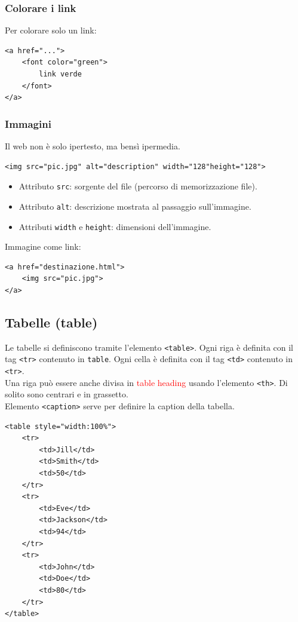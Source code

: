 \documentclass{article}
\begin{document}
\subsubsection{Colorare i link}
Per colorare solo un link:
\begin{lstlisting}[style=htmlstyle]
<a href="...">
    <font color="green">
        link verde
    </font>
</a>
\end{lstlisting}
\subsubsection{Immagini}
Il web non è solo ipertesto, ma bensì ipermedia.
\begin{lstlisting}[style=htmlstyle]
<img src="pic.jpg" alt="description" width="128"height="128">
\end{lstlisting}
\begin{itemize}
    \item Attributo \texttt{src}: sorgente del file (percorso di memorizzazione file).
    \item Attributo \texttt{alt}: descrizione mostrata al passaggio sull'immagine.
    \item Attributi \texttt{width} e \texttt{height}: dimensioni dell'immagine.
\end{itemize}
Immagine come link:
\begin{lstlisting}[style=htmlstyle]
<a href="destinazione.html">
    <img src="pic.jpg">
</a>
\end{lstlisting}
\pagebreak
\subsection{Tabelle (table)}
Le tabelle si definiscono tramite l'elemento \texttt{<table>}. Ogni riga è definita con il tag \texttt{<tr>} contenuto in \texttt{table}.
Ogni cella è definita con il tag \texttt{<td>} contenuto in \texttt{<tr>}.
\\ Una riga può essere anche divisa in \textcolor{red}{table heading} usando l'elemento \texttt{<th>}. Di solito sono centrari e in grassetto.
\\ Elemento \texttt{<caption>} serve per definire la caption della tabella.
\begin{lstlisting}[style=htmlstyle]
<table style="width:100%">
    <tr>
        <td>Jill</td>
        <td>Smith</td>
        <td>50</td>
    </tr>
    <tr>
        <td>Eve</td>
        <td>Jackson</td>
        <td>94</td>
    </tr>
    <tr>
        <td>John</td>
        <td>Doe</td>
        <td>80</td>
    </tr>
</table>
\end{lstlisting}
\end{document}
